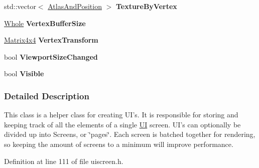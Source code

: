 \begin{DoxyCompactItemize}
\item 
\hypertarget{classMezzanine_1_1UI_1_1Screen_aa7706e94290bcc28054f97e0e33fbdad}{
std::vector$<$ \hyperlink{structMezzanine_1_1UI_1_1AtlasAndPosition}{AtlasAndPosition} $>$ {\bfseries TextureByVertex}}
\label{classMezzanine_1_1UI_1_1Screen_aa7706e94290bcc28054f97e0e33fbdad}

\item 
\hypertarget{classMezzanine_1_1UI_1_1Screen_a3659b98054a12d545caedf52c52b1e12}{
\hyperlink{namespaceMezzanine_adcbb6ce6d1eb4379d109e51171e2e493}{Whole} {\bfseries VertexBufferSize}}
\label{classMezzanine_1_1UI_1_1Screen_a3659b98054a12d545caedf52c52b1e12}

\item 
\hypertarget{classMezzanine_1_1UI_1_1Screen_a68e6e88fb6d759b0c74d2c3ce27a4b29}{
\hyperlink{classMezzanine_1_1Matrix4x4}{Matrix4x4} {\bfseries VertexTransform}}
\label{classMezzanine_1_1UI_1_1Screen_a68e6e88fb6d759b0c74d2c3ce27a4b29}

\item 
\hypertarget{classMezzanine_1_1UI_1_1Screen_a02412ab0548da0b6a7c46acd0624a253}{
bool {\bfseries ViewportSizeChanged}}
\label{classMezzanine_1_1UI_1_1Screen_a02412ab0548da0b6a7c46acd0624a253}

\item 
\hypertarget{classMezzanine_1_1UI_1_1Screen_afaad9357e5fa77fa43db4acaad23d29e}{
bool {\bfseries Visible}}
\label{classMezzanine_1_1UI_1_1Screen_afaad9357e5fa77fa43db4acaad23d29e}

\end{DoxyCompactItemize}


\subsubsection{Detailed Description}
This class is a helper class for creating UI's. It is responsible for storing and keeping track of all the elements of a single \hyperlink{namespaceMezzanine_1_1UI}{UI} screen. UI's can optionally be divided up into Screens, or \char`\"{}pages\char`\"{}. Each screen is batched together for rendering, so keeping the amount of screens to a minimum will improve performance. 

Definition at line 111 of file uiscreen.h.



